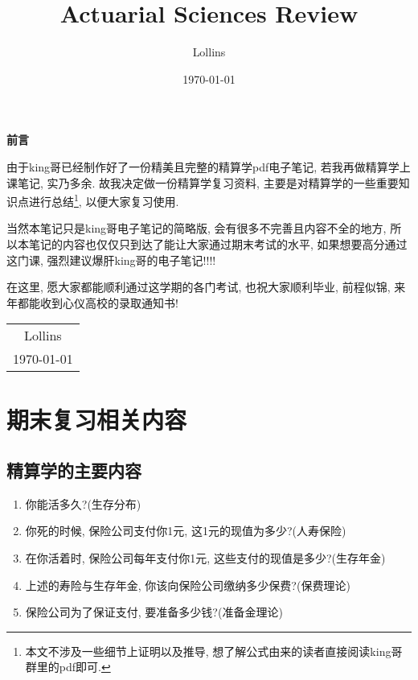 \documentclass[lang=cn,10pt]{elegantbook}
\title{Actuarial Sciences Review}
\author{Lollins}
\institute{安徽师范大学数学与统计学院}
\date{\today}
\begin{document}
\maketitle

\begin{center}
	\Huge\textbf{前言}
\end{center}
\par
由于king哥已经制作好了一份精美且完整的精算学pdf电子笔记, 若我再做精算学上课笔记, 实乃多余. 故我决定做一份精算学复习资料, 主要是对精算学的一些重要知识点进行总结\footnote{本文不涉及一些细节上证明以及推导, 想了解公式由来的读者直接阅读king哥群里的pdf即可. }, 以便大家复习使用. 

当然本笔记只是king哥电子笔记的简略版, 会有很多不完善且内容不全的地方, 所以本笔记的内容也仅仅只到达了能让大家通过期末考试的水平, 如果想要高分通过这门课, 强烈建议爆肝king哥的电子笔记!!!!

在这里, 愿大家都能顺利通过这学期的各门考试, 也祝大家顺利毕业, 前程似锦, 来年都能收到心仪高校的录取通知书!

\begin{flushright}
	\begin{tabular}{c}
		Lollins \\
		\today
	\end{tabular}
\end{flushright}

\newpage
{}
\setcounter{page}{1}
\tableofcontents
\newpage
\setcounter{page}{1}

\chapter*{期末复习相关内容}
\section*{精算学的主要内容}
\begin{enumerate}
    \item 你能活多久?(生存分布)
    \item 你死的时候, 保险公司支付你1元, 这1元的现值为多少?(人寿保险)
    \item 在你活着时, 保险公司每年支付你1元, 这些支付的现值是多少?(生存年金)
    \item 上述的寿险与生存年金, 你该向保险公司缴纳多少保费?(保费理论)
    \item 保险公司为了保证支付, 要准备多少钱?(准备金理论)
\end{enumerate}
\end{document}
